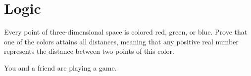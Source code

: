 \section{Logic}
\begin{boxProblem}{}
    Every point of three-dimensional space is colored red, green, or blue.
    Prove that one of the colors attains all distances, meaning that any positive real number represents the distance between two points of this color.
\end{boxProblem}
\begin{boxProblem}{}
    You and a friend are playing a game. 
\end{boxProblem}


